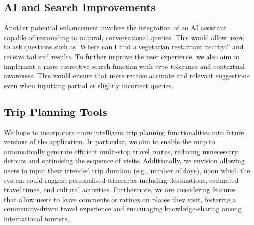 \subsection{AI and Search Improvements}
Another potential enhancement involves the integration of an AI assistant capable of responding to natural, conversational queries. This would allow users to ask questions such as ‘Where can I find a vegetarian restaurant nearby?’ and receive tailored results. To further improve the user experience, we also aim to implement a more corrective search function with typo-tolerance and contextual awareness. This would ensure that users receive accurate and relevant suggestions even when inputting partial or slightly incorrect queries.

\subsection{Trip Planning Tools}
We hope to incorporate more intelligent trip planning functionalities into future versions of the application. In particular, we aim to enable the map to automatically generate efficient multi-stop travel routes, reducing unnecessary detours and optimising the sequence of visits. Additionally, we envision allowing users to input their intended trip duration (e.g., number of days), upon which the system could suggest personalised itineraries including destinations, estimated travel times, and cultural activities. Furthermore, we are considering features that allow users to leave comments or ratings on places they visit, fostering a community-driven travel experience and encouraging knowledge-sharing among international tourists.

